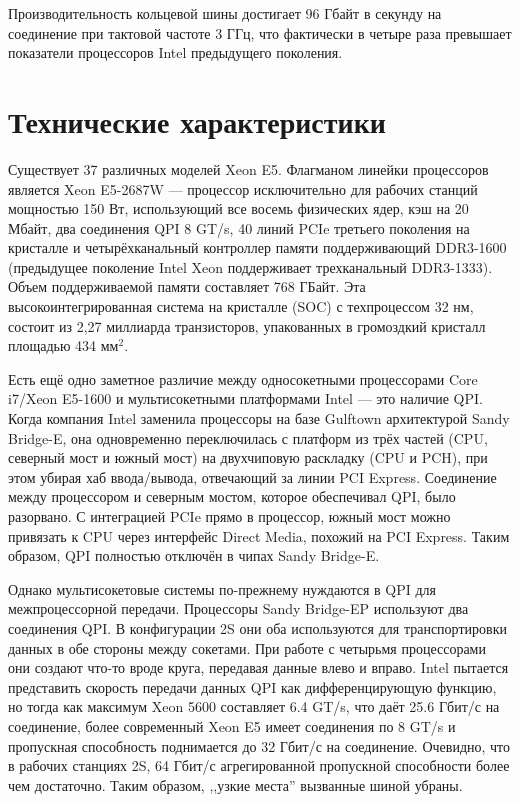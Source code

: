 \documentclass[a4paper,12pt,notitlepage,headsepline,pdftex]{scrartcl}
\begin{document}
  Производительность кольцевой шины достигает 96 Гбайт в секунду на соединение
  при тактовой частоте 3 ГГц, что фактически в четыре раза превышает
  показатели процессоров Intel предыдущего поколения.

\section{Технические характеристики}
  Существует 37 различных моделей Xeon E5.
  Флагманом линейки процессоров является Xeon E5-2687W ---
  процессор исключительно для рабочих станций мощностью 150 Вт, использующий
  все восемь физических ядер, кэш на 20 Мбайт, два соединения QPI 8 GT/s, 40
  линий PCIe третьего поколения на кристалле и четырёхканальный контроллер
  памяти поддерживающий DDR3-1600 (предыдущее поколение Intel Xeon
  поддерживает трехканальный DDR3-1333).
  Объем поддерживаемой памяти составляет 768 ГБайт.
  Эта высокоинтегрированная система на кристалле (SOC) с техпроцессом 32 нм,
  состоит из 2,27 миллиарда транзисторов, упакованных в громоздкий кристалл
  площадью 434 мм$^{2}$.

  Есть ещё одно заметное различие между односокетными процессорами Core
  i7/Xeon E5-1600 и мультисокетными платформами Intel --- это наличие QPI.
  Когда компания Intel заменила процессоры на базе Gulftown архитектурой Sandy
  Bridge-E, она одновременно переключилась с платформ из трёх частей (CPU,
  северный мост и южный мост) на двухчиповую раскладку (CPU и PCH), при этом
  убирая хаб ввода/вывода, отвечающий за линии PCI Express.
  Соединение между процессором и северным мостом, которое обеспечивал QPI,
  было разорвано.
  С интеграцией PCIe прямо в процессор, южный мост можно привязать к CPU через
  интерфейс Direct Media, похожий на PCI Express.
  Таким образом, QPI полностью отключён в чипах Sandy Bridge-E.

  Однако мультисокетовые системы по-прежнему нуждаются в QPI для
  межпроцессорной передачи.
  Процессоры Sandy Bridge-EP используют два соединения QPI.
  В конфигурации 2S они оба используются для транспортировки данных в обе
  стороны между сокетами.
  При работе с четырьмя процессорами они создают что-то вроде круга, передавая
  данные влево и вправо.
  Intel пытается представить скорость передачи данных QPI как дифференцирующую
  функцию, но тогда как максимум Xeon 5600 составляет 6.4 GT/s, что даёт 25.6
  Гбит/с на соединение, более современный Xeon E5 имеет соединения по 8 GT/s и
  пропускная способность поднимается до 32 Гбит/с на соединение.
  Очевидно, что в рабочих станциях 2S, 64 Гбит/с агрегированной пропускной
  способности более чем достаточно.
  Таким образом, ,,узкие места'' вызванные шиной убраны.
\end{document}
